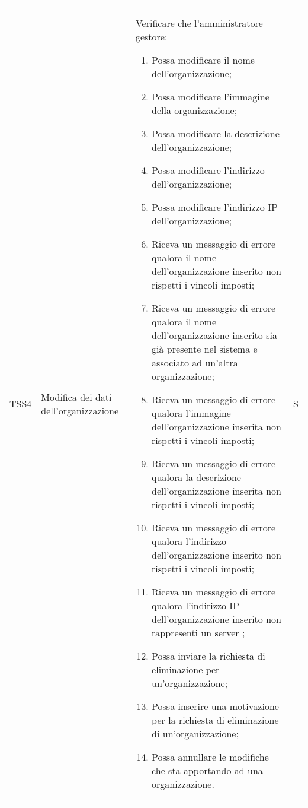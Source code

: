 {\begin{longtable}{ c  C{2.5cm}  C{10cm} C{1cm}}
TSS4 & Modifica dei dati dell'organizzazione &
Verificare che l'amministratore gestore:
\begin{enumerate}
    \item Possa modificare il nome dell'organizzazione;
    \item Possa modificare l'immagine della organizzazione;
    \item Possa modificare la descrizione dell’organizzazione;
    \item Possa modificare l'indirizzo dell’organizzazione;
    \item Possa modificare l'indirizzo IP dell'organizzazione;
    \item Riceva un messaggio di errore qualora il nome dell'organizzazione inserito non rispetti i vincoli imposti;
    \item Riceva un messaggio di errore qualora il nome dell'organizzazione inserito sia già presente nel sistema e associato ad un'altra organizzazione;
    \item Riceva un messaggio di errore qualora l'immagine dell'organizzazione inserita non rispetti i vincoli imposti;
    \item Riceva un messaggio di errore qualora la descrizione dell'organizzazione inserita non rispetti i vincoli imposti;
    \item Riceva un messaggio di errore qualora l'indirizzo dell'organizzazione inserito non rispetti i vincoli imposti;
    \item Riceva un messaggio di errore qualora l'indirizzo IP dell'organizzazione inserito non rappresenti un server ;
    \item Possa inviare la richiesta di eliminazione per un'organizzazione;
    \item Possa inserire una motivazione per la richiesta di eliminazione di un'organizzazione;
    \item Possa annullare le modifiche che sta apportando ad una organizzazione.
\end{enumerate} & S \\


\end{longtable}}
